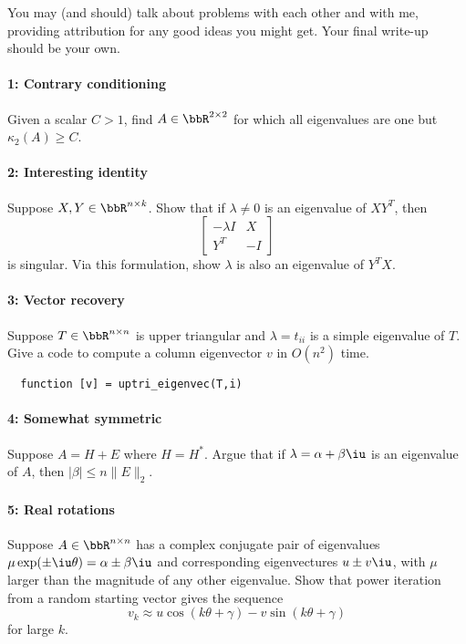 \documentclass[12pt, leqno]{article} %
\begin{document}

You may (and should) talk about problems with each other and with me,
providing attribution for any good ideas you might get.  Your final
write-up should be your own.

\paragraph*{1: Contrary conditioning}
Given a scalar $C > 1$, find $A \in \bbR^{2 \times 2}$ for which all
eigenvalues are one but $\kappa_2(A) \geq C$.

\paragraph*{2: Interesting identity}
Suppose $X, Y \in \bbR^{n \times k}$.  Show that if $\lambda \neq 0$
is an eigenvalue of $XY^T$, then
\[
  \begin{bmatrix}
    -\lambda I & X \\
    Y^T & -I
  \end{bmatrix}
\]
is singular.  Via this formulation, show $\lambda$ is also an
eigenvalue of $Y^T X$.

\paragraph*{3: Vector recovery}
Suppose $T \in \bbR^{n \times n}$ is upper triangular and
$\lambda = t_{ii}$ is a simple eigenvalue of $T$.  Give a code
to compute a column eigenvector $v$ in $O(n^2)$ time.
\begin{lstlisting}
  function [v] = uptri_eigenvec(T,i)
\end{lstlisting}

\paragraph*{4: Somewhat symmetric}
Suppose $A = H + E$ where $H=H^*$.  Argue that if
$\lambda = \alpha+\beta \iu$ is an eigenvalue of $A$,
then $|\beta| \leq n \|E\|_2$.

\paragraph*{5: Real rotations}
Suppose $A \in \bbR^{n \times n}$ has a complex conjugate pair
of eigenvalues $\mu \exp(\pm \iu \theta) = \alpha \pm \beta \iu$
and corresponding eigenvectures $u \pm v\iu$,
with $\mu$ larger than the magnitude of any other eigenvalue.
Show that power iteration from a random starting vector gives the sequence
\[
  v_k \approx u \cos(k\theta + \gamma) - v \sin(k\theta + \gamma)
\]
for large $k$.
\end{document}
